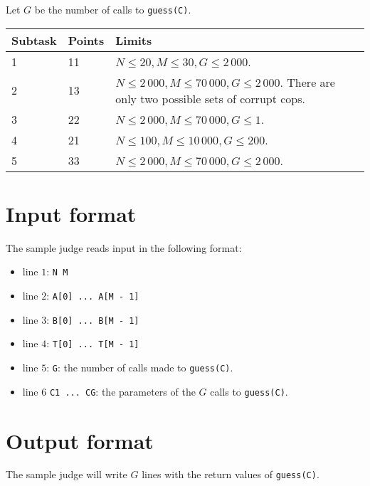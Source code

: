 Let $G$ be the number of calls to \texttt{guess(C)}.
\begin{tabular}{|l|l|l|}
  \hline
  \textbf{Subtask} & \textbf{Points} & \textbf{Limits} \\ \hline
  1 & 11 & $N \le 20, M \le 30, G \le 2\,000$. \\ \hline
  2 & 13 & $N \le 2\,000, M \le 70\,000, G \le 2\,000$. There are only two possible sets of corrupt cops. \\ \hline
  3 & 22 & $N \le 2\,000, M \le 70\,000, G \le 1$. \\ \hline
  4 & 21 & $N \le 100, M \le 10\,000, G \le 200$. \\ \hline
  5 & 33 & $N \le 2\,000, M \le 70\,000, G \le 2\,000$. \\ \hline
\end{tabular}

\section*{Input format}
The sample judge reads input in the following format:

\begin{itemize}
  \item line $1$: \texttt{N M}
  \item line $2$: \texttt{A[0] ... A[M - 1]}
  \item line $3$: \texttt{B[0] ... B[M - 1]}
  \item line $4$: \texttt{T[0] ... T[M - 1]}
  \item line $5$: \texttt{G}: the number of calls made to \texttt{guess(C)}.
  \item line $6$ \texttt{C1 ... CG}: the parameters of the $G$ calls to \texttt{guess(C)}.
\end{itemize}

\section*{Output format}
The sample judge will write $G$ lines with the return values of \texttt{guess(C)}.
